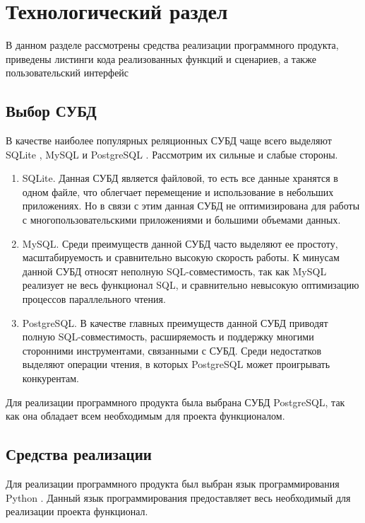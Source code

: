 \chapter{Технологический раздел}
В данном разделе рассмотрены средства реализации программного продукта, приведены листинги кода реализованных функций и сценариев, а также пользовательский интерфейс

\section{Выбор СУБД} 

В качестве наиболее популярных реляционных СУБД чаще всего выделяют SQLite \cite{sqlite}, MySQL \cite{mysql} и PostgreSQL \cite{postgres}. Рассмотрим их сильные и слабые стороны.

\begin{enumerate}
	\item SQLite. Данная СУБД является файловой, то есть все данные хранятся в одном файле, что облегчает перемещение и использование в небольших приложениях. Но в связи с этим данная СУБД не оптимизирована для работы с многопользовательскими приложениями и большими объемами данных.
	\item MySQL. Среди преимуществ данной СУБД часто выделяют ее простоту, масштабируемость и сравнительно высокую скорость работы. К минусам данной СУБД относят неполную SQL-совместимость, так как MySQL реализует не весь функционал SQL, и сравнительно невысокую оптимизацию процессов параллельного чтения.
	\item PostgreSQL. В качестве главных преимуществ данной СУБД приводят полную SQL-совместимость, расширяемость и поддержку многими сторонними инструментами, связанными с СУБД. Среди недостатков выделяют операции чтения, в которых PostgreSQL может проигрывать конкурентам.
\end{enumerate}

Для реализации программного продукта была выбрана СУБД PostgreSQL, так как она обладает всем необходимым для проекта функционалом.

\section{Средства реализации}

Для реализации программного продукта был выбран язык программирования Python \cite{python}. Данный язык программирования предоставляет весь необходимый для реализации проекта функционал.

